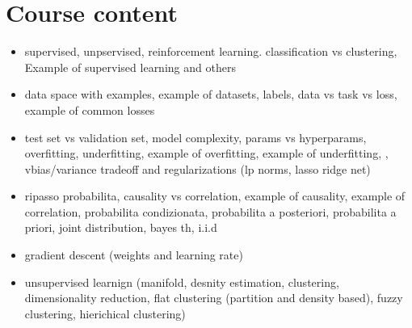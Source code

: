 \documentclass{article}
\begin{document}
\section{Course content}
\begin{itemize}
    \item supervised, unpservised, reinforcement learning. classification vs clustering, Example of supervised learning and others
    \item data space with examples, example of datasets, labels, data vs task vs loss, example of common losses
    \item test set vs validation set, model complexity, params vs hyperparams,
    overfitting, underfitting, example of overfitting, example of underfitting, , 
    vbias/variance tradeoff and regularizations (lp norms, lasso ridge net)
    \item ripasso probabilita, causality vs correlation, example of causality, example of correlation, probabilita condizionata, probabilita a posteriori, probabilita a priori, joint distribution, bayes th, i.i.d
    \item gradient descent (weights and learning rate)
    \item unsupervised learnign (manifold, desnity estimation, clustering, dimensionality reduction, flat clustering (partition and density based), fuzzy clustering, hierichical clustering)
\end{itemize}
\end{document}
